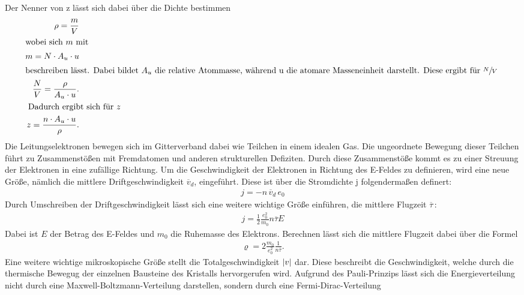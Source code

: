 Der Nenner von z lässt sich dabei über die Dichte bestimmen
\begin{subequations}
\begin{align}
    \rho = \frac{m}{V} \label{eq:4a} \\
    \intertext{wobei sich $m$ mit
    }
    m =N \cdot A_u \cdot u \label{eq:4b} \\
    \intertext{beschreiben lässt. Dabei bildet $A_u$ die relative Atommasse, während u die atomare Masseneinheit darstellt.
    Diese ergibt für $\sfrac{N}{V}$
    }
    \frac{N}{V}= \frac{\rho}{A_u \cdot u}.\label{eq:4c} \\
    \intertext{ Dadurch ergibt sich für $z$
    }
    z=\frac{n \cdot A_u \cdot u}{\rho}. \label{eq:4d}
\end{align}
\end{subequations}
Die Leitungselektronen bewegen sich im Gitterverband dabei wie Teilchen in einem idealen Gas.
Die ungeordnete Bewegung dieser Teilchen führt zu Zusammenstößen mit Fremdatomen und anderen
strukturellen Defiziten. Durch diese Zusammenstöße kommt es zu einer Streuung der
Elektronen in eine zufällige Richtung. Um die Geschwindigkeit der Elektronen in 
Richtung des E-Feldes zu definieren, wird eine neue Größe, nämlich die mittlere Driftgeschwindigkeit
$\overline{v} _d$, eingeführt. Diese ist über die Stromdichte j folgendermaßen definert: \cite{V311}
\begin{align}
    j = -n \, \overline{v} _d\, e_0 \label{eq:5}
\end{align}
Durch Umschreiben der Driftgeschwindigkeit lässt sich eine weitere wichtige Größe einführen,
die mittlere Flugzeit $\overline{\tau}\,$: \cite{V311}
\begin{align}
    j = \frac{1}{2}\frac{e_0^2}{m_0} n \overline{\tau} E \label{eq:6}
\end{align}
Dabei ist $E$ der Betrag des E-Feldes und $m_0$ die Ruhemasse des Elektrons.
Berechnen lässt sich die mittlere Flugzeit dabei über die Formel \cite{V311}
\begin{align}
\varrho = 2 \frac{m_0}{e_0^2}\frac{1}{n \overline{\tau}}. \label{eq:7}
\end{align}
Eine weitere wichtige mikroskopische Größe stellt die Totalgeschwindigkeit $\lvert v\rvert$ dar.
Diese beschreibt die Geschwindigkeit, welche durch die thermische Bewegug der einzelnen
Bausteine des Kristalls hervorgerufen wird. Aufgrund des Pauli-Prinzips lässt sich
die Energieverteilung nicht durch eine Maxwell-Boltzmann-Verteilung darstellen, 
sondern durch eine Fermi-Dirac-Verteilung \cite{V311}
